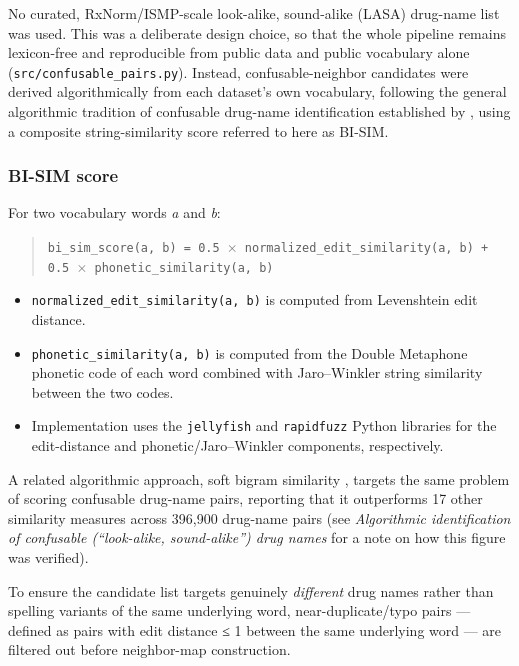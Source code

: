 \documentclass[fleqn,10pt]{wlpeerj}
\providecommand{\tightlist}{\setlength{\itemsep}{0pt}\setlength{\parskip}{0pt}}
\begin{document}
No curated, RxNorm/ISMP-scale look-alike, sound-alike (LASA) drug-name list was used. This was a deliberate design choice, so that the whole pipeline remains lexicon-free and reproducible from public data and public vocabulary alone (\texttt{src/\allowbreak confusable\_pairs.py}). Instead, confusable-neighbor candidates were derived algorithmically from each dataset's own vocabulary, following the general algorithmic tradition of confusable drug-name identification established by \citet{kondrak2004identification,kondrak2006automatic}, using a composite string-similarity score referred to here as BI-SIM.

\subsubsection*{BI-SIM score}\label{sec:bisim-score}

For two vocabulary words \emph{a} and \emph{b}:

\begin{quote}
\texttt{bi\_sim\_score(a, b) =\allowbreak\ 0.5 $\times$\allowbreak\ normalized\_edit\_similarity(a, b)\allowbreak\ + 0.5 $\times$\allowbreak\ phonetic\_similarity(a, b)}
\end{quote}

\begin{itemize}
\tightlist
\item
  \texttt{normalized\_edit\_similarity(a,\ b)} is computed from Levenshtein edit distance.
\item
  \texttt{phonetic\_similarity(a,\ b)} is computed from the Double Metaphone phonetic code of each word combined with Jaro--Winkler string similarity between the two codes.
\item
  Implementation uses the \texttt{jellyfish} and \texttt{rapidfuzz} Python libraries for the edit-distance and phonetic/Jaro--Winkler components, respectively.
\end{itemize}

A related algorithmic approach, soft bigram similarity \citep{millanhernandez2019soft}, targets the same problem of scoring confusable drug-name pairs, reporting that it outperforms 17 other similarity measures across 396,900 drug-name pairs (see \textit{Algorithmic identification of confusable (\textquotedblleft look-alike, sound-alike\textquotedblright) drug names} for a note on how this figure was verified).

To ensure the candidate list targets genuinely \emph{different} drug names rather than spelling variants of the same underlying word, near-duplicate/typo pairs --- defined as pairs with edit distance ≤ 1 between the same underlying word --- are filtered out before neighbor-map construction.
\end{document}
